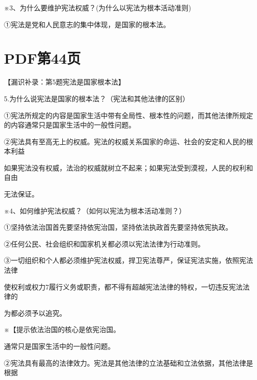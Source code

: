 \documentclass[lang=cn,11pt]{elegantbook}
\newcommand{\daofasym}[1]{{\daofasymbolfont #1}}
\newcommand{\daofasym}[1]{#1}
\begin{document}
※3、为什么要维护宪法权威？(为什么以宪法为根本活动准则)\par

\daofasym{①}宪法是党和人民意志的集中体现，是国家的根本法。\par


\section*{PDF第44页}

【漏识补录：第5题宪法是国家根本法】\par

5.为什么说宪法是国家的根本法？（宪法和其他法律的区别）\par

\daofasym{①}宪法所规定的内容是国家生活中带有全局性、根本性的问题，而其他法律所规定的内容通常只是国家生活中的一般性问题。\par

\daofasym{②}宪法具有至高无上的权威。宪法的权威关系国家的命运、社会的安定和人民的根本利益\par

如果宪法没有权威，法治的权威就树立不起来；如果宪法受到漠视，人民的权利和自由\par

无法保证。\par

※4、如何维护宪法权威？（如何以宪法为根本活动准则？）\par

\daofasym{①}坚持依法治国首先要坚持依宪治国，坚持依法执政首先要坚持依宪执政。\par

\daofasym{②}任何公民、社会组织和国家机关都必须以宪法法律为行动准则。\par

\daofasym{③}一切组织和个人都必须维护宪法权威，捍卫宪法尊严，保证宪法实施，依照宪法法律\par

使权利或权力7履行义务或职责，都不得有超越宪法法律的特权，一切违反宪法法律的\par

为都必须予以追究。\par

※【提示依法治国的核心是依宪治国。\par

通常只是国家生活中的一般性问题。\par

\daofasym{②}宪法具有最高的法律效力。宪法是其他法律的立法基础和立法依据，其他法律是根据\par
\end{document}
